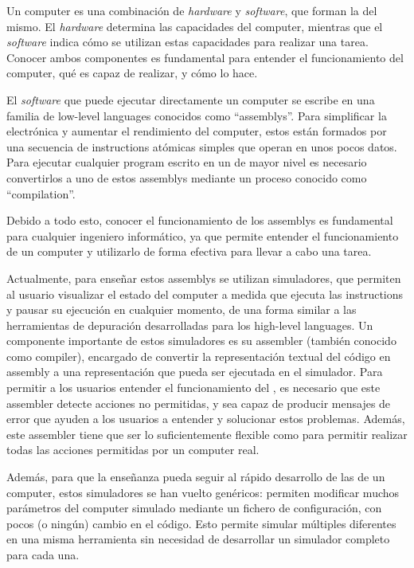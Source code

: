 Un \gls{computer} es una combinación de \textit{hardware} y \textit{software},
que forman la  del mismo. El \textit{hardware}
determina las capacidades del \gls{computer}, mientras que el \textit{software}
indica cómo se utilizan estas capacidades para realizar una tarea. Conocer ambos
componentes es fundamental para entender el funcionamiento del \gls{computer},
qué es capaz de realizar, y cómo lo hace.

El \textit{software} que puede ejecutar directamente un \gls{computer} se
escribe en una familia de \glspl{low-level language} conocidos como
``\glspl{assembly}''. Para simplificar la electrónica y aumentar el rendimiento
del \gls{computer}, estos están formados por una secuencia de
\glspl{instruction} atómicas simples que operan en unos pocos datos. Para
ejecutar cualquier \gls{program} escrito en un  de mayor nivel es necesario convertirlos a uno de estos
\glspl{assembly} mediante un proceso conocido como ``\gls{compilation}''.

Debido a todo esto, conocer el funcionamiento de los \glspl{assembly} es
fundamental para cualquier ingeniero informático, ya que permite entender el
funcionamiento de un \gls{computer} y utilizarlo de forma efectiva para llevar a
cabo una tarea.

Actualmente, para enseñar estos \glspl{assembly} se utilizan simuladores, que
permiten al usuario visualizar el estado del \gls{computer} a medida que ejecuta
las \glspl{instruction} y pausar su ejecución en cualquier momento, de una forma
similar a las herramientas de depuración desarrolladas para los
\glspl{high-level language}. Un componente importante de estos simuladores es su
\gls{assembler} (también conocido como \gls{compiler}), encargado de convertir
la representación textual del código en \gls{assembly} a una representación que
pueda ser ejecutada en el simulador. Para permitir a los usuarios entender el
funcionamiento del , es necesario que
este \gls{assembler} detecte acciones no permitidas, y sea capaz de producir
mensajes de error que ayuden a los usuarios a entender y solucionar estos
problemas. Además, este \gls{assembler} tiene que ser lo suficientemente
flexible como para permitir realizar todas las acciones permitidas por un
\gls{computer} real.

Además, para que la enseñanza pueda seguir al rápido desarrollo de las
 de un \gls{computer}, estos simuladores se han
vuelto genéricos: permiten modificar muchos parámetros del \gls{computer}
simulado mediante un fichero de configuración, con pocos (o ningún) cambio en el
código. Esto permite simular múltiples  diferentes
en una misma herramienta sin necesidad de desarrollar un simulador completo para
cada una.

